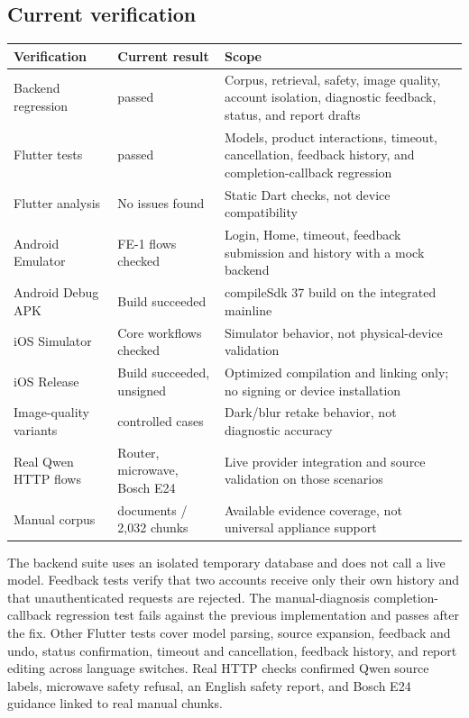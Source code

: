 \documentclass[10.5pt,a4paper]{article}
\begin{document}
\subsection{Current verification}

\begin{center}
\small
\begin{tabularx}{\textwidth}{>{\raggedright\arraybackslash}p{37mm} >{\raggedright\arraybackslash}p{32mm} >{\raggedright\arraybackslash}X}
\toprule
\textbf{Verification} & \textbf{Current result} & \textbf{Scope} \\
\midrule
Backend regression & 48 passed & Corpus, retrieval, safety, image quality, account isolation, diagnostic feedback, status, and report drafts \\
Flutter tests & 12 passed & Models, product interactions, timeout, cancellation, feedback history, and completion-callback regression \\
Flutter analysis & No issues found & Static Dart checks, not device compatibility \\
Android Emulator & FE-1 flows checked & Login, Home, timeout, feedback submission and history with a mock backend \\
Android Debug APK & Build succeeded & compileSdk 37 build on the integrated mainline \\
iOS Simulator & Core workflows checked & Simulator behavior, not physical-device validation \\
iOS Release & Build succeeded, unsigned & Optimized compilation and linking only; no signing or device installation \\
Image-quality variants & 26 controlled cases & Dark/blur retake behavior, not diagnostic accuracy \\
Real Qwen HTTP flows & Router, microwave, Bosch E24 & Live provider integration and source validation on those scenarios \\
Manual corpus & 16 documents / 2,032 chunks & Available evidence coverage, not universal appliance support \\
\bottomrule
\end{tabularx}
\end{center}

The backend suite uses an isolated temporary database and does not call a live model. Feedback tests verify that two accounts receive only their own history and that unauthenticated requests are rejected. The manual-diagnosis completion-callback regression test fails against the previous implementation and passes after the fix. Other Flutter tests cover model parsing, source expansion, feedback and undo, status confirmation, timeout and cancellation, feedback history, and report editing across language switches. Real HTTP checks confirmed Qwen source labels, microwave safety refusal, an English safety report, and Bosch E24 guidance linked to real manual chunks.
\end{document}
